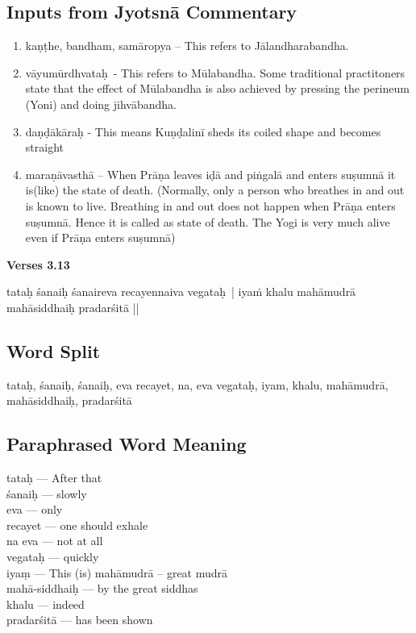 \subsection*{Inputs from Jyotsnā Commentary}

\begin{enumerate}
\item kaṇṭhe, bandham, samāropya – This refers to Jālandharabandha.
\item vāyumūrdhvataḥ - This refers to Mūlabandha. Some traditional practitoners state that the effect of Mūlabandha is also achieved by pressing the perineum (Yoni) and doing jihvābandha. 
\item daṇḍākāraḥ - This means Kuṇḍalinī sheds its coiled shape and becomes straight 
\item maraṇāvasthā – When Prāṇa leaves iḍā and piṅgalā and enters suṣumnā  it is(like) the state of death. (Normally, only a person who breathes in and out is known to live. Breathing in and out does not happen when Prāṇa enters suṣumnā. Hence it is called as state of death. The Yogi is very much alive even if Prāṇa enters suṣumnā)
\end{enumerate}


\noindent \textbf{Verses 3.13}

\begin{center}
tataḥ śanaiḥ śanaireva recayennaiva vegataḥ | 
iyaṁ khalu mahāmudrā mahāsiddhaiḥ pradarśitā ||
\end{center}

\subsection*{Word Split}

tataḥ,  śanaiḥ,  śanaiḥ, eva recayet, na, eva vegataḥ, iyam, khalu, mahāmudrā,  mahāsiddhaiḥ, pradarśitā 

\subsection*{Paraphrased Word Meaning}

\begin{multicols}{2}
tataḥ --- After that \\
śanaiḥ --- slowly \\
eva --- only \\
recayet --- one should exhale \\
na eva --- not at all \\
vegataḥ --- quickly \\
iyaṃ --- This  (is) mahāmudrā – great mudrā\\
mahā-siddhaiḥ --- by the great siddhas\\
khalu --- indeed \\
pradarśitā --- has been shown 
\end{multicols}

